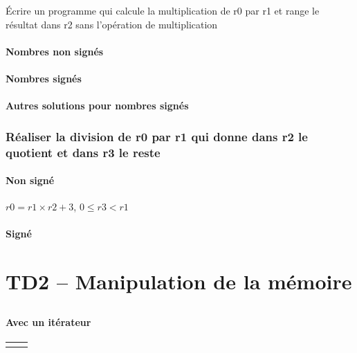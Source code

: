 \documentclass[12pt,a4paper,openany]{book}
\begin{document}
	\subsection{}
	\'Ecrire un programme qui calcule la multiplication de r0 par r1 et range le résultat dans r2 sans l'opération de multiplication
	\subsubsection{Nombres non signés}
	
	\subsubsection{Nombres signés}
	
	
	\subsubsection{Autres solutions pour nombres signés}
	
	
	\subsection{Réaliser la division de r0
	par r1 qui donne dans r2 le quotient et dans r3
	le reste}
	\subsubsection{Non signé}
	$r0 = r1 \times r2 + 3$, $0 \leq r3 < r1$
	
	
	\subsubsection{Signé}
	
	
\chapter{TD2 -- Manipulation de la mémoire}
\section{}
\subsubsection{Avec un itérateur}
\begin{tabular}{p{8cm}p{8cm}}

	&

\end{tabular}
\end{document}
